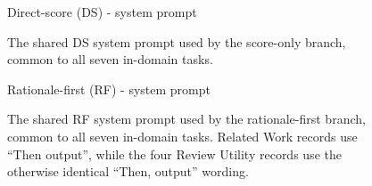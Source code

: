 
\clearpage
\begin{figure}[t]
\begin{promptboxbig}{Direct-score (DS) - system prompt}
  \ptextsys{\SystemScoreOnly}
\end{promptboxbig}
\caption{The shared DS system prompt used by the score-only branch,
common to all seven in-domain tasks.}
\label{fig:so}
\end{figure}

\begin{figure}[t]
\begin{promptboxbig}{Rationale-first (RF) - system prompt}
  \ptextsys{\SystemCoTThen}
\end{promptboxbig}
\caption{The shared RF system prompt used by the rationale-first branch,
common to all seven in-domain tasks. Related Work records use ``Then
output'', while the four Review Utility records use the otherwise
identical ``Then, output'' wording.}
\label{fig:rs}
\end{figure}


